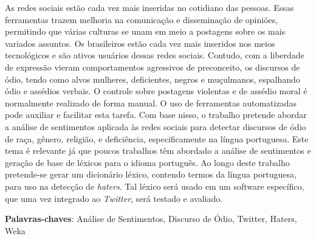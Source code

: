 \setlength{\absparsep}{18pt} %
\begin{resumo}

As redes sociais estão cada vez mais inseridas no cotidiano das pessoas. Essas ferramentas trazem melhoria na comunicação e disseminação de opiniões, permitindo que várias culturas se unam em meio a postagens sobre os mais variados assuntos. Os brasileiros estão cada vez mais inseridos nos meios tecnológicos e são ativos usuários dessas redes sociais. Contudo, com a liberdade de expressão vieram comportamentos agressivos de preconceito, os discursos de ódio, tendo como alvos mulheres, deficientes, negros e muçulmanos, espalhando ódio e assédios verbais. O controle sobre postagens violentas e de assédio moral é normalmente realizado de forma manual. O uso de ferramentas automatizadas pode auxiliar e facilitar esta tarefa. Com base nisso, o trabalho pretende abordar a análise de sentimentos aplicada às redes sociais para detectar discursos de ódio de raça, gênero, religião, e deficiência, especificamente na língua portuguesa. Este tema é relevante já que poucos trabalhos têm abordado a análise de sentimentos e geração de base de léxicos para o idioma português. Ao longo deste trabalho pretende-se gerar um dicionário léxico, contendo termos da língua portuguesa, para uso na detecção de \textit{haters}. Tal léxico será usado em um software específico, que uma vez integrado ao \textit{Twitter}, será testado e avaliado.

 \textbf{Palavras-chaves}: Análise de Sentimentos, Discurso de Ódio, Twitter, Haters, Weka
\end{resumo}

